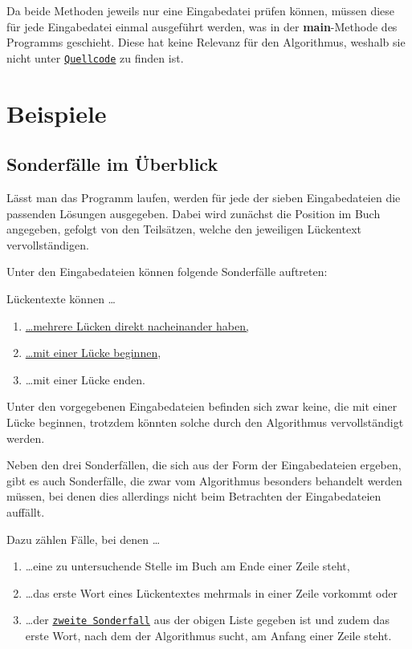 \documentclass[a4paper, 10pt, ngerman]{scrartcl}
\begin{document}
Da beide Methoden jeweils nur eine Eingabedatei prüfen können,
müssen diese für jede Eingabedatei einmal ausgeführt werden,
was in der \textbf{main}-Methode des Programms geschieht.
Diese hat keine Relevanz für den Algorithmus,
weshalb sie nicht unter \hyperref[sec:quellcode]{\texttt{Quellcode}} zu finden ist.


\section{Beispiele}\label{sec:beispiele}
\subsection{Sonderfälle im Überblick}\label{ueberblickSondefaelle}
Lässt man das Programm laufen,
werden für jede der sieben Eingabedateien die passenden Lösungen ausgegeben.
Dabei wird zunächst die Position im Buch angegeben,
gefolgt von den Teilsätzen,
welche den jeweiligen Lückentext vervollständigen.

Unter den Eingabedateien können folgende Sonderfälle auftreten:

Lückentexte können \ldots

\begin{enumerate}
	\item \hyperref[sec:ersterSonderfall]{\ldots mehrere Lücken direkt nacheinander haben,}\label{sonderfallEins}
	\item \hyperref[sec:zweiterSonderfall]{\ldots mit einer Lücke beginnen},\label{sonderfallZwei}
	\item \ldots mit einer Lücke enden.\label{sonderfallDrei}
    \setcounter{enumTemp}{\theenumi}
\end{enumerate}

Unter den vorgegebenen Eingabedateien befinden sich zwar keine,
die mit einer Lücke beginnen,
trotzdem könnten solche durch den Algorithmus vervollständigt werden.

Neben den drei Sonderfällen,
die sich aus der Form der Eingabedateien ergeben,
gibt es auch Sonderfälle,
die zwar vom Algorithmus besonders behandelt werden müssen,
bei denen dies allerdings nicht beim Betrachten der Eingabedateien auffällt.

Dazu zählen Fälle,
bei denen \ldots

\begin{enumerate}
	\setcounter{enumi}{\theenumTemp}
	\item \ldots eine zu untersuchende Stelle im Buch am Ende einer Zeile steht,\label{sonderfallVier}
	\item \ldots das erste Wort eines Lückentextes mehrmals in einer Zeile vorkommt oder\label{sonderfallFuenf}
	\item \ldots der \hyperref[sonderfallZwei]{\texttt{zweite Sonderfall}} aus der obigen Liste gegeben ist
	und zudem das erste Wort,
	nach dem der Algorithmus sucht,
	am Anfang einer Zeile steht.\label{sonderfallSechs}
\end{enumerate}
\end{document}
